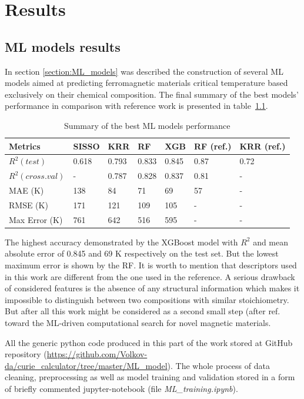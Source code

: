 \chapter{Results}

\section{ML models results}
In section \ref{section:ML_models} was described the construction of several ML models aimed at predicting ferromagnetic materials critical temperature based exclusively on their chemical composition. The final summary of the best models’ performance in comparison with reference work is presented in table~\ref{tab:best_models_summary}. 

\begin{table}[H]
\centering
\caption{Summary of the best ML models performance}
\begin{tabular}{|p{2.5cm}|p{1.6cm}|p{1.6cm}|p{1.6cm}|p{1.6cm}|p{1.6cm}|p{1.8cm}|}
\hline 
Metrics & SISSO & KRR & RF & XGB & RF (ref.) & KRR (ref.) \\ 
\hline 
$R^2 (test)$ & 0.618 & 0.793 & 0.833 & 0.845 & 0.87 & 0.72 \\ 
$R^2 (cross.val)$ & - & 0.787 & 0.828 & 0.837 & 0.81 & - \\ 
MAE (K) & 138 & 84 & 71 & 69 & 57 & - \\ 
RMSE (K) & 171 & 121 & 109 & 105 & - & - \\ 
Max Error (K) & 761 & 642 & 516 & 595 & - & - \\ 
\hline 
\end{tabular} 
\label{tab:best_models_summary}
\end{table}

The highest accuracy demonstrated by the XGBoost model with $R^2$ and mean absolute error of 0.845 and 69 K respectively on the test set. But the lowest maximum error is shown by the RF.
It is worth to mention that descriptors used in this work are different from the one used in the reference. 
A serious drawback of considered features is the absence of any structural information which makes it impossible to distinguish between two compositions with similar stoichiometry. But after all this work might be considered as a second small step (after ref.  \cite{Nelson:2019ui} toward the ML-driven computational search for novel magnetic materials.

All the generic python code produced in this part of the work stored at GitHub repository (\url{https://github.com/Volkov-da/curie_calculator/tree/master/ML_model}).
The whole process of data cleaning, preprocessing as well as model training and validation stored in a form of briefly commented jupyter-notebook (file \textit{ML\_training.ipynb}).

